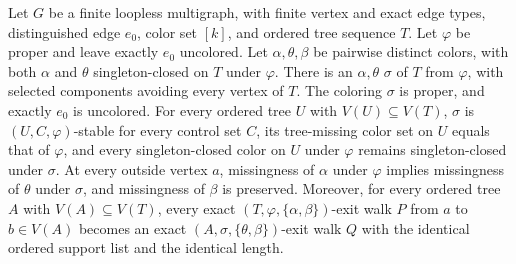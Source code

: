 \begin{lemma}
Let $G$ be a finite loopless multigraph, with finite vertex and exact edge
types, distinguished edge $e_0$, color set $[k]$, and ordered tree sequence
$T$. Let $\varphi$ be proper and leave exactly $e_0$ uncolored. Let
$\alpha,\theta,\beta$ be pairwise distinct colors, with both $\alpha$
and $\theta$ singleton-closed on $T$ under $\varphi$.
There is an $\alpha,\theta$  $\sigma$
of $T$ from $\varphi$, with selected components avoiding every vertex
of $T$. The coloring $\sigma$ is proper, and exactly $e_0$ is uncolored.
For every ordered tree $U$ with $V(U)\subseteq V(T)$,
$\sigma$ is $(U,C,\varphi)$-stable for every control set $C$, its
tree-missing color set on $U$ equals that of $\varphi$, and every
singleton-closed color on $U$ under $\varphi$ remains singleton-closed
under $\sigma$.
At every outside vertex $a$, missingness of $\alpha$ under $\varphi$
implies missingness of $\theta$ under $\sigma$, and missingness of
$\beta$ is preserved. Moreover, for every ordered tree $A$ with
$V(A)\subseteq V(T)$, every exact $(T,\varphi,\{\alpha,\beta\})$-exit
walk $P$ from $a$ to $b\in V(A)$ becomes an exact
$(A,\sigma,\{\theta,\beta\})$-exit walk $Q$ with the identical ordered
support list and the identical length.
\end{lemma}
